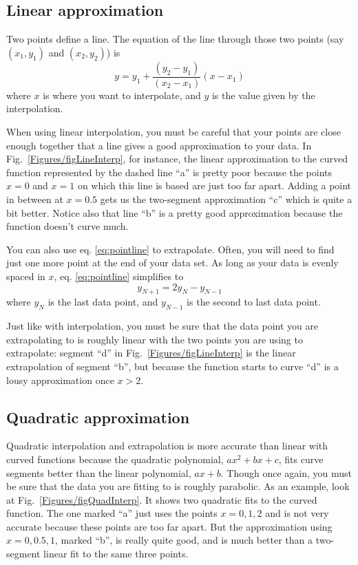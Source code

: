 \subsection*{Linear approximation}
Two points define a line.  The equation of the line through those two points
(say $(x_1,y_1)$ and $(x_2,y_2)$) is
\begin{equation}\label{eq:pointline}
y = y_1+ \frac{(y_2-y_1) }{ (x_2-x_1)} (x-x_1)
\end{equation}
where $x$ is where you want to interpolate, and $y$ is the value given by the interpolation.

When using linear interpolation, you must be careful  that your points are
close enough together that a line gives a good approximation to your data. In
Fig.~\ref{Figures/figLineInterp}, for instance, the linear approximation to
the curved function represented by the dashed line ``a'' is pretty
poor because the points $x=0$ and $x=1$ on which this line is based
are just too far apart. Adding a point in between at $x=0.5$ gets
us the two-segment approximation ``c'' which is quite a bit better.
Notice also that line ``b'' is a pretty good approximation because
the function doesn't curve much.

You can also use eq. \ref{eq:pointline} to extrapolate. Often,
you will need to find just one more point at the end of your data set. As long as your data is evenly spaced in $x$, eq. \ref{eq:pointline} simplifies to
\begin{equation}\label{eq:linExtrap}
y_{N+1} = 2 y_N-y_{N-1}
\end{equation}
where $y_N$ is the last data point, and $y_{N-1}$ is the second to last data point.

Just like with interpolation, you must be sure that the data point you are extrapolating to is roughly linear with the two points you are using to extrapolate: segment ``d'' in Fig.~\ref{Figures/figLineInterp}
is the linear extrapolation of segment ``b'', but because the
function starts to curve ``d'' is a lousy approximation once $x>2$.



\subsection*{Quadratic approximation}
Quadratic interpolation and extrapolation is more accurate than
linear with curved functions because the quadratic polynomial, $a x^2 + bx + c$, fits curve segments better than the linear polynomial, $ax + b$.
Though once again, you must be sure that the data you are fitting to is roughly parabolic. As an example, look at Fig.~\ref{Figures/figQuadInterp}. It shows two quadratic fits to the curved
function. The one marked ``a'' just uses the points $x=0,1,2$ and is
not very accurate because these points are too far apart. But the
approximation using $x=0,0.5,1$, marked ``b'', is really quite good,
and is much better than a two-segment linear fit to the same three points.

